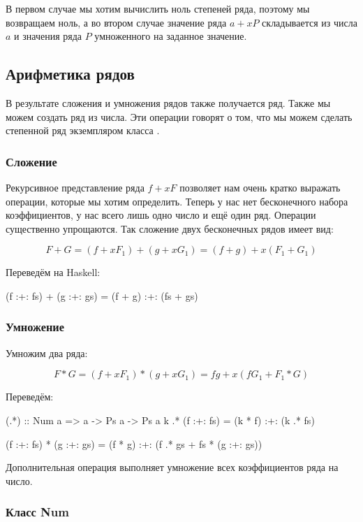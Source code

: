 В первом случае мы хотим вычислить ноль степеней ряда,
поэтому мы возвращаем ноль, а во втором случае значение
ряда $a + x P$ складывается из числа $a$ и значения
ряда $P$ умноженного на заданное значение.  


\subsection{Арифметика рядов}

В результате сложения и умножения рядов также
получается ряд. Также мы можем создать ряд из числа.
Эти операции говорят о том, что мы можем сделать 
степенной ряд экземпляром класса .

\subsubsection{Сложение}

Рекурсивное представление ряда $f + x F$ позволяет нам
очень кратко выражать операции, которые мы хотим определить.
Теперь у нас нет бесконечного набора коэффициентов, у нас
всего лишь одно число и ещё один ряд. Операции существенно
упрощаются. Так сложение двух бесконечных рядов имеет вид:

\[ F + G = (f + x F_1) + (g + x G_1) = (f+g) + x (F_1 + G_1) \]

Переведём на Haskell:


\begin{code}
(f :+: fs) + (g :+: gs) = (f + g) :+: (fs + gs)
\end{code}


\subsubsection{Умножение}

Умножим два ряда:

\[ F*G = (f + x F_1) * (g + x G_1) = f g + x (f G_1 + F_1 * G) \]

Переведём:


\begin{code}
(.*) :: Num a => a -> Ps a -> Ps a
k .* (f :+: fs) = (k * f) :+: (k .* fs)  

(f :+: fs) * (g :+: gs) = (f * g) :+: (f .* gs + fs * (g :+: gs))
\end{code}


Дополнительная операция  выполняет умножение
всех коэффициентов ряда на число.

\subsubsection{Класс Num}

